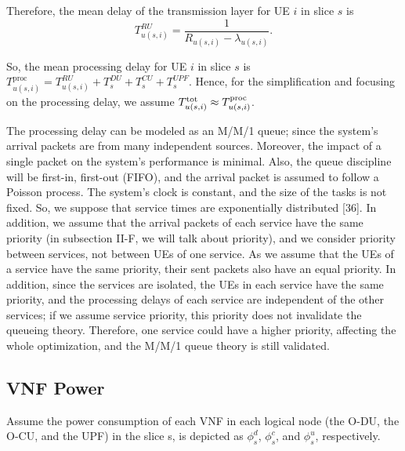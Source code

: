 \documentclass[lettersize,journal]{IEEEtran}
\begin{document}
Therefore, the mean delay of the transmission layer for UE $i$ in slice $s$ is
\begin{equation}
 T_{u(s,i)}^{RU} = \frac{1}{R_{u(s,i)} - \lambda_{u(s,i)}}.
\end{equation}

So, the mean processing delay for UE $i$ in slice $s$ is $T^{\text{proc}}_{u(s,i)} =  T^{RU}_{u(s,i)} + T^{DU}_{s} + T^{CU}_{s} + T^{UPF}_{s}.$
Hence, for the simplification and focusing on the processing delay, we assume $T^{\text{\text{tot}}}_{u(s,i)} \approx T^{\text{proc}}_{u(s,i)} $. %

The processing delay can be modeled as an M/M/1 queue; since the system's arrival packets are from many independent sources. Moreover, the impact of a single packet on the system's performance is minimal. Also, the queue discipline will be first-in, first-out (FIFO), and the arrival packet is assumed to follow a Poisson process. The system's clock is constant, and the size of the tasks is not fixed. So, we suppose that service times are exponentially distributed [36]. In addition, we assume that the arrival packets of each service have the same priority (in subsection II-F, we will talk about priority), and we consider priority between services, not between UEs of one service. As we assume that the UEs of a service have the same priority, their sent packets also have an equal priority. In addition, since the services are isolated, the UEs in each service have the same priority, and the processing delays of each service are independent of the other services; if we assume service priority, this priority does not invalidate the queueing theory. Therefore, one service could have a higher priority, affecting the whole optimization, and the M/M/1 queue theory is still validated.

\subsection{VNF Power}
Assume the power consumption of each VNF in each logical node (the O-DU, the O-CU, and the UPF) in the slice s, is depicted as $\phi_{s}^d$, $\phi_{s}^c$, and $\phi_{s}^u$, respectively.
\end{document}
